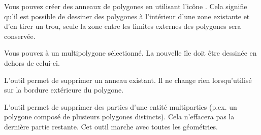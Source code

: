 \begin{itemize}
Vous pouvez créer des anneaux de polygones en utilisant l'icône . Cela signifie qu'il est possible de dessiner des polygones à l'intérieur d'une zone existante et d'en tirer un trou,  seule la zone entre les limites externes des polygones sera conservée.


Vous pouvez  à un multipolygone sélectionné. La nouvelle île doit être dessinée en dehors de celui-ci.


L'outil  permet de supprimer un anneau existant. Il ne change rien lorsqu’utilisé sur la bordure extérieure du polygone.


L'outil  permet de supprimer des parties d'une entité multiparties (p.ex. un polygone composé de plusieurs polygones distincts). Cela n'effacera pas la dernière partie restante. Cet outil marche avec toutes les géométries.



\end{itemize}

